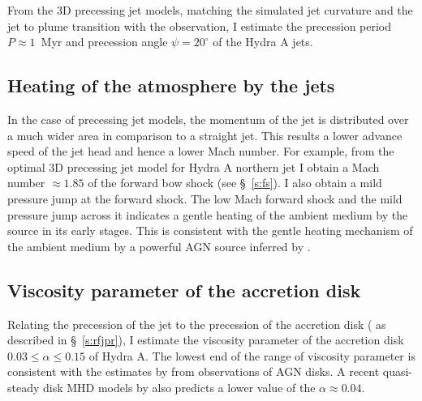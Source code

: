 From the 3D precessing jet models, matching the simulated jet curvature and the jet to plume transition with the observation, I estimate the precession period $P \approx 1$~Myr and precession angle $\psi = 20^{\circ}$ of the Hydra A jets. 
%


\subsection{Heating of the atmosphere by the jets}
 In the case of precessing jet models, the momentum of the jet is distributed over a much wider area in comparison to a straight jet. This results a lower advance speed of the jet head and hence a lower Mach number. For example, from the optimal 3D precessing jet model for Hydra A northern jet I obtain a Mach number $\approx 1.85$ of the forward bow shock (see \S~\ref{s:fs}). I also obtain a mild pressure jump at the forward shock. The low Mach forward shock and the mild pressure jump across it indicates a gentle heating of the ambient medium by the source in its early stages. This is consistent with the gentle heating mechanism of the ambient medium by a powerful AGN source inferred by \citet{mcnamara12}. 


\subsection{Viscosity parameter of the accretion disk} Relating the precession of the jet to the precession of the accretion disk ( as described in \S~\ref{s:rfjpr}), I estimate the viscosity parameter of the accretion disk  $0.03\le \alpha \le 0.15$ of Hydra A. The lowest end of the range of viscosity parameter is consistent with the estimates by \citet{starling04} from observations of AGN disks. A recent quasi-steady disk MHD models by \citet{parkin13b} also predicts a lower value of the $\alpha \approx 0.04$. 


%

